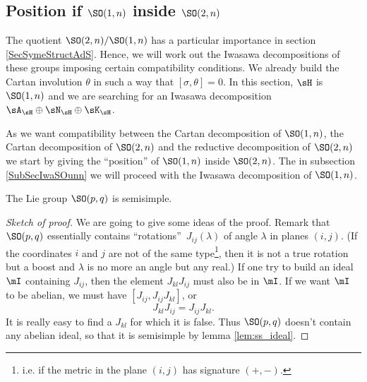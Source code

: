 \subsection{Position if \texorpdfstring{$ \SO(1,n)$}{SO(1,n)} inside \texorpdfstring{$ \SO(2,n)$}{SO(2,n)}}

The quotient $\SO(2,n)/\SO(1,n)$ has a particular importance in section \ref{SecSymeStructAdS}. Hence, we will work out the Iwasawa decompositions of these groups imposing certain compatibility conditions. We already build the Cartan involution $\theta$ in such a way that $[\sigma,\theta]=0$. In this section, \( \sH\) is \( \SO(1,n)\) and we are searching for an Iwasawa decomposition \( \sA_{\sH}\oplus\sN_{\sH}\oplus\sK_{\sH}\). 

As we want compatibility between the Cartan decomposition of \( \SO(1,n)\), the Cartan decomposition of \( \SO(2,n)\) and the reductive decomposition of \( \SO(2,n)\) we start by giving the ``position'' of \( \SO(1,n)\) inside \( \SO(2,n)\). The in subsection \ref{SubSecIwaSOunn} we will proceed with the Iwasawa decomposition of \( \SO(1,n)\).



\begin{lemma} \label{lem:SO_pq_ss}
The Lie group $\SO(p,q)$ is semisimple.
\end{lemma}

\begin{proof}[Sketch of proof]
We are going to give some ideas of the proof. Remark that $\SO(p,q)$ essentially contains ``rotations''\ $J_{ij}(\lambda)$ of angle $\lambda$ in planes $(i,j)$. (If the coordinates $i$ and $j$ are not of the same type\footnote{i.e. if the metric in the plane $(i,j)$ has signature $(+,-)$.}, then it is not a true rotation but a boost and $\lambda$ is no more an angle but any real.) If one try to build an ideal $\mI$ containing $J_{ij}$, then the element $J_{kl}J_{ij}$ must also be in $\mI$. If we want $\mI$ to be abelian, we must have $[J_{ij},J_{ij}J_{kl}]$, or
\[
  J_{kl}J_{ij}=J_{ij}J_{kl}.
\]
It is really easy to find a $J_{kl}$ for which it is false. Thus $\SO(p,q)$ doesn't contain any abelian ideal, so that it is semisimple by lemma \ref{lem:ss_ideal}.
\end{proof}

